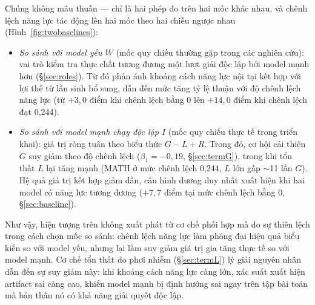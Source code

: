 \documentclass[11pt,a4paper]{article}
\begin{document}
Chúng không mâu thuẫn --- chỉ là hai phép đo trên hai mốc khác nhau, và chênh lệch năng lực tác
động lên hai mốc theo hai chiều ngược nhau (Hình~\ref{fig:twobaselines}):
\begin{itemize}\itemsep2pt
\item \emph{So sánh với model yếu $W$} (mốc quy chiếu thường gặp trong các nghiên cứu): vai trò 
      kiểm tra thực chất tương đương một lượt giải độc lập bởi model mạnh hơn (\S\ref{sec:roles}). 
      Từ đó phản ánh khoảng cách năng lực nội tại kết hợp với 
      lợi thế từ lần sinh bổ sung, dẫn đến mức tăng tỷ lệ thuận với độ chênh lệch năng lực (từ 
      $+3{,}0$ điểm khi chênh lệch bằng 0 lên $+14{,}0$ điểm khi chênh lệch đạt 0,244).
\item \emph{So sánh với model mạnh chạy độc lập $I$} (mốc quy chiếu thực tế trong triển khai):
      giá trị ròng tuân theo biểu thức $G - L + R$. Trong đó, cơ hội cải thiện $G$ suy giảm
      theo độ chênh lệch ($\beta_1 = -0{,}19$, \S\ref{sec:termG}), trong khi tổn thất $L$ lại
      tăng mạnh (MATH ở mức chênh lệch 0,244, $L$ lớn gấp $\sim$11 lần $G$). Hệ quả
      giá trị kết hợp giảm dần, cấu hình dương duy nhất xuất hiện khi hai
      model có năng lực tương đương ($+7{,}7$ điểm tại mức chênh lệch bằng 0,
      \S\ref{sec:baseline}).
\end{itemize}
Như vậy, hiện tượng trên không xuất phát từ cơ chế phối hợp mà do sự thiên lệch trong cách chọn
mốc so sánh: chênh lệch năng lực làm phóng đại hiệu quả biểu kiến so với model yếu, nhưng lại
làm suy giảm giá trị gia tăng thực tế so với model mạnh. Cơ chế tổn thất do phơi nhiễm
(\S\ref{sec:termL}) lý giải nguyên nhân dẫn đến sự suy giảm này: khi khoảng cách năng lực càng
lớn, xác suất xuất hiện artifact sai càng cao, khiến model mạnh bị định hướng sai
ngay trên tập bài toán mà bản thân nó có khả năng giải quyết độc lập.
\end{document}
